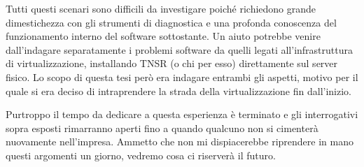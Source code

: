 Tutti questi scenari sono difficili da investigare poiché richiedono grande dimestichezza con gli strumenti di diagnostica e una profonda conoscenza del funzionamento interno del software sottostante. Un aiuto potrebbe venire dall'indagare separatamente i problemi software da quelli legati all'infrastruttura di virtualizzazione, installando TNSR (o chi per esso) direttamente sul server fisico. Lo scopo di questa tesi però era indagare entrambi gli aspetti, motivo per il quale si era deciso di intraprendere la strada della virtualizzazione fin dall'inizio.

Purtroppo il tempo da dedicare a questa esperienza è terminato e gli interrogativi sopra esposti rimarranno aperti fino a quando qualcuno non si cimenterà nuovamente nell'impresa. Ammetto che non mi dispiacerebbe riprendere in mano questi argomenti un giorno, vedremo cosa ci riserverà il futuro.



